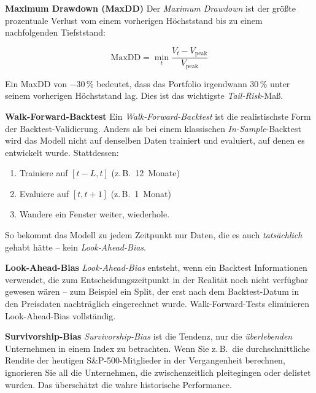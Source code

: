 \begin{definition}
\textbf{Maximum Drawdown (MaxDD)}
Der \emph{Maximum Drawdown} ist der größte prozentuale Verlust vom
einem vorherigen Höchststand bis zu einem nachfolgenden Tiefststand:

\[
  \text{MaxDD} = \min_t \frac{V_t - V_\text{peak}}{V_\text{peak}}
\]

Ein MaxDD von $-30\,\%$ bedeutet, dass das Portfolio irgendwann
30\,\% unter seinem vorherigen Höchststand lag. Dies ist das
wichtigste \emph{Tail-Risk}-Maß.
\end{definition}

\begin{definition}
\textbf{Walk-Forward-Backtest}
Ein \emph{Walk-Forward-Backtest} ist die realistischste Form der
Backtest-Validierung. Anders als bei einem klassischen
\emph{In-Sample}-Backtest wird das Modell nicht auf denselben Daten
trainiert und evaluiert, auf denen es entwickelt wurde. Stattdessen:

\begin{enumerate}
  \item Trainiere auf $[t - L, t]$ (z.\,B.\ 12~Monate)
  \item Evaluiere auf $[t, t+1]$ (z.\,B.\ 1~Monat)
  \item Wandere ein Fenster weiter, wiederhole.
\end{enumerate}

So bekommt das Modell zu jedem Zeitpunkt nur Daten, die es auch
\emph{tatsächlich} gehabt hätte -- kein \emph{Look-Ahead-Bias}.
\end{definition}

\begin{definition}
\textbf{Look-Ahead-Bias}
\emph{Look-Ahead-Bias} entsteht, wenn ein Backtest Informationen
verwendet, die zum Entscheidungszeitpunkt in der Realität noch nicht
verfügbar gewesen wären -- zum Beispiel ein Split, der erst nach dem
Backtest-Datum in den Preisdaten nachträglich eingerechnet wurde.
Walk-Forward-Tests eliminieren Look-Ahead-Bias vollständig.
\end{definition}

\begin{definition}
\textbf{Survivorship-Bias}
\emph{Survivorship-Bias} ist die Tendenz, nur die
\emph{überlebenden} Unternehmen in einem Index zu betrachten. Wenn
Sie z.\,B.\ die durchschnittliche Rendite der heutigen S\&P-500-Mitglieder
in der Vergangenheit berechnen, ignorieren Sie all die Unternehmen,
die zwischenzeitlich pleitegingen oder delistet wurden. Das
überschätzt die wahre historische Performance.
\end{definition}

